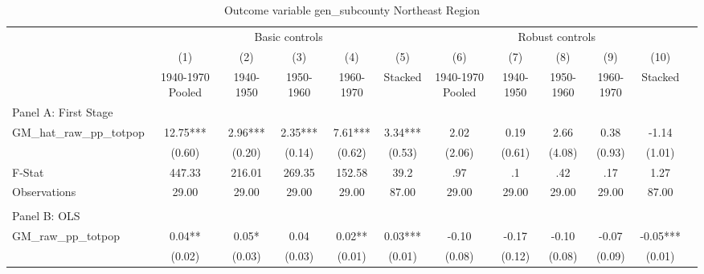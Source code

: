  \begin{table}[htbp]\centering {} \begin{threeparttable} \caption{Outcome variable gen\_subcounty Northeast Region} \begin{tabular}{l*{11}{c}} \toprule
          &\multicolumn{5}{c}{Basic controls}                                   &\multicolumn{5}{c}{Robust controls}                                  \\\cmidrule(lr){2-6}\cmidrule(lr){7-11}
          &\multicolumn{1}{c}{(1)}&\multicolumn{1}{c}{(2)}&\multicolumn{1}{c}{(3)}&\multicolumn{1}{c}{(4)}&\multicolumn{1}{c}{(5)}&\multicolumn{1}{c}{(6)}&\multicolumn{1}{c}{(7)}&\multicolumn{1}{c}{(8)}&\multicolumn{1}{c}{(9)}&\multicolumn{1}{c}{(10)}\\
          &\multicolumn{1}{c}{1940-1970 Pooled}&\multicolumn{1}{c}{1940-1950}&\multicolumn{1}{c}{1950-1960}&\multicolumn{1}{c}{1960-1970}&\multicolumn{1}{c}{Stacked}&\multicolumn{1}{c}{1940-1970 Pooled}&\multicolumn{1}{c}{1940-1950}&\multicolumn{1}{c}{1950-1960}&\multicolumn{1}{c}{1960-1970}&\multicolumn{1}{c}{Stacked}\\
\cmidrule(lr){1-11}
\multicolumn{10}{l}{Panel A: First Stage}\\
\cmidrule(lr){1-11}
GM\_hat\_raw\_pp\_totpop&     12.75***&      2.96***&      2.35***&      7.61***&      3.34***&      2.02   &      0.19   &      2.66   &      0.38   &     -1.14   \\
          &    (0.60)   &    (0.20)   &    (0.14)   &    (0.62)   &    (0.53)   &    (2.06)   &    (0.61)   &    (4.08)   &    (0.93)   &    (1.01)   \\
\midrule
F-Stat    &    447.33   &    216.01   &    269.35   &    152.58   &      39.2   &       .97   &        .1   &       .42   &       .17   &      1.27   \\
Observations&     29.00   &     29.00   &     29.00   &     29.00   &     87.00   &     29.00   &     29.00   &     29.00   &     29.00   &     87.00   \\
\cmidrule[\heavyrulewidth](lr){1-11} \\ \cmidrule[\heavyrulewidth](lr){1-11}
\multicolumn{10}{l}{Panel B: OLS}\\
\cmidrule(lr){1-11}
GM\_raw\_pp\_totpop&      0.04** &      0.05*  &      0.04   &      0.02** &      0.03***&     -0.10   &     -0.17   &     -0.10   &     -0.07   &     -0.05***\\
          &    (0.02)   &    (0.03)   &    (0.03)   &    (0.01)   &    (0.01)   &    (0.08)   &    (0.12)   &    (0.08)   &    (0.09)   &    (0.01)   \\

\end{tabular}
\end{threeparttable}
\end{table}
